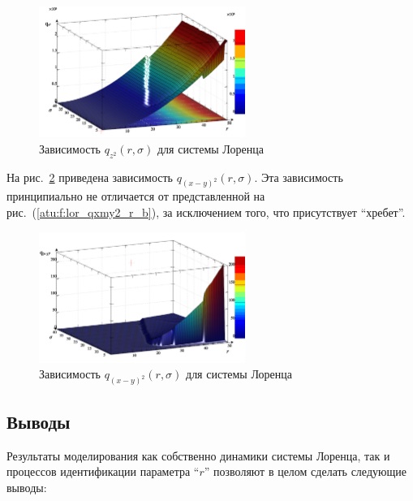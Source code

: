 \begin{figure}[ht!]
  \centerline{  \includegraphics[width=0.60\textwidth]{p/cha/lor/q2d/lor_qz2_r_sigma.png}  }
  \caption{Зависимость $q_{z^2}(r,\sigma)$ для системы Лоренца}
  \label{atu:f:lor_qz2_r_sigma}
\end{figure}

На рис.~\ref{atu:f:lor_qxmy2_r_sigma} приведена зависимость
$q_{(x-y)^2}(r,\sigma)$. Эта зависимость принципиально не отличается
от представленной на рис.~(\ref{atu:f:lor_qxmy2_r_b}),
за исключением того, что присутствует ``хребет''.

\begin{figure}[ht!]
  \centerline{  \includegraphics[width=0.60\textwidth]{p/cha/lor/q2d/lor_qxmy2_r_sigma.png}  }
  \caption{Зависимость $q_{(x-y)^2}(r,\sigma)$ для системы Лоренца}
  \label{atu:f:lor_qxmy2_r_sigma}
\end{figure}



\subsection{Выводы}  %

Результаты моделирования как собственно динамики
системы Лоренца,
так и процессов идентификации параметра ``$r$''
позволяют в целом сделать следующие выводы:

